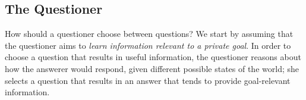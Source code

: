 \documentclass[12pt, floatsintext, jou]{apa6}
\begin{document}
\subsection{The Questioner}

How should a questioner choose between questions?
%
We start by assuming that the questioner aims to \emph{learn information relevant to a private goal}.
%
In order to choose a question that results in useful information, the questioner reasons about how the answerer would respond, given different possible states of the world; she selects a question that results in an answer that tends to provide goal-relevant information.
%




\newcommand{\KL}[2]{\ensuremath{D_{KL}({#1}\, \| \, {#2})}}
\newcommand{\E}[2]{\ensuremath{\mathbb{E}_{#1}\left [#2 \right]}}
\end{document}
